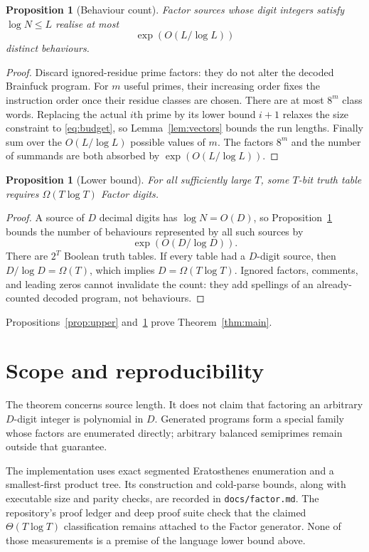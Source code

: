 \documentclass[10pt]{article}
\newtheorem{proposition}[theorem]{Proposition}
\theoremstyle{remark}
\begin{document}
\begin{proposition}[Behaviour count]\label{prop:count}
Factor sources whose digit integers satisfy $\log N\le L$ realise at most
\[
  \exp(O(L/\log L))
\]
distinct behaviours.
\end{proposition}

\begin{proof}
Discard ignored-residue prime factors: they do not alter the decoded
Brainfuck program.  For $m$ useful primes, their increasing order fixes the
instruction order once their residue classes are chosen.  There are at most
$8^m$ class words.  Replacing the actual $i$th prime by its lower bound
$i+1$ relaxes the size constraint to \eqref{eq:budget}, so
Lemma~\ref{lem:vectors} bounds the run lengths.  Finally sum over the
$O(L/\log L)$ possible values of $m$.  The factors $8^m$ and the number of
summands are both absorbed by $\exp(O(L/\log L))$.
\end{proof}

\begin{proposition}[Lower bound]\label{prop:lower}
For all sufficiently large $T$, some $T$-bit truth table requires
$\Omega(T\log T)$ Factor digits.
\end{proposition}

\begin{proof}
A source of $D$ decimal digits has $\log N=O(D)$, so
Proposition~\ref{prop:count} bounds the number of behaviours represented by
all such sources by
\[
  \exp(O(D/\log D)).
\]
There are $2^T$ Boolean truth tables.  If every table had a $D$-digit source,
then $D/\log D=\Omega(T)$, which implies $D=\Omega(T\log T)$.
Ignored factors, comments, and leading zeros cannot invalidate the count:
they add spellings of an already-counted decoded program, not behaviours.
\end{proof}

Propositions~\ref{prop:upper} and~\ref{prop:lower} prove
Theorem~\ref{thm:main}.

\section{Scope and reproducibility}

The theorem concerns source length.  It does not claim that factoring an
arbitrary $D$-digit integer is polynomial in $D$.  Generated programs form a
special family whose factors are enumerated directly; arbitrary balanced
semiprimes remain outside that guarantee.

The implementation uses exact segmented Eratosthenes enumeration and a
smallest-first product tree.  Its construction and cold-parse bounds, along
with executable size and parity checks, are recorded in
\texttt{docs/factor.md}.  The repository's proof ledger and deep proof suite
check that the claimed $\Theta(T\log T)$ classification remains attached to
the Factor generator.  None of those measurements is a premise of the
language lower bound above.
\end{document}
